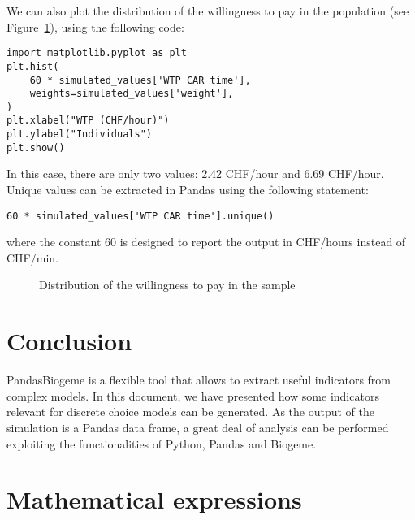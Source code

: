 \documentclass[12pt,a4paper]{article}
\begin{document}
We can also plot the distribution of the willingness to pay in the
population (see Figure~\ref{fig:wtp}), using the following code:
\begin{lstlisting}
import matplotlib.pyplot as plt
plt.hist(
    60 * simulated_values['WTP CAR time'],
    weights=simulated_values['weight'],
)
plt.xlabel("WTP (CHF/hour)")
plt.ylabel("Individuals")
plt.show()
\end{lstlisting}
In this case, there are only two values: 2.42 CHF/hour and 6.69
CHF/hour. Unique values can be extracted in Pandas using the following
statement:
\begin{lstlisting}
60 * simulated_values['WTP CAR time'].unique()
\end{lstlisting}
where the constant 60 is designed to report the output in CHF/hours
instead of CHF/min.
\begin{figure}[htb]
\begin{center}

\end{center}
\caption{\label{fig:wtp}Distribution of the willingness to pay in the sample}
\end{figure}
\section{Conclusion}

PandasBiogeme is a flexible tool that allows to extract useful
indicators from complex models. In this document, we have presented
how some indicators relevant for discrete choice models  can be
generated. As the output of the simulation is a Pandas data frame, a
great deal of analysis can be performed exploiting the functionalities of
Python, Pandas and Biogeme.


\clearpage

\appendix

\section{Mathematical expressions}\label{sec:expressions}

\renewcommand{\arraystretch}{1.2}
\end{document}
